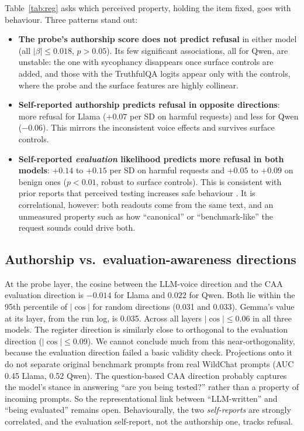\documentclass[10pt]{article}
\begin{document}
Table~\ref{tab:reg} asks which perceived property, holding the item fixed, goes with behaviour. Three patterns stand out:
\begin{itemize}
\item \textbf{The probe's authorship score does not predict refusal} in either model (all $|\beta|\le 0.018$, $p>0.05$). Its few significant associations, all for Qwen, are unstable: the one with sycophancy disappears once surface controls are added, and those with the TruthfulQA logits appear only with the controls, where the probe and the surface features are highly collinear.
\item \textbf{Self-reported authorship predicts refusal in opposite directions}: more refusal for Llama ($+0.07$ per SD on harmful requests) and less for Qwen ($-0.06$). This mirrors the inconsistent voice effects and survives surface controls.
\item \textbf{Self-reported \emph{evaluation} likelihood predicts more refusal in both models}: $+0.14$ to $+0.15$ per SD on harmful requests and $+0.05$ to $+0.09$ on benign ones ($p<0.01$, robust to surface controls). This is consistent with prior reports that perceived testing increases safe behaviour \citep{abdelnabi2025hawthorne,xiong2025pre}. It is correlational, however: both readouts come from the same text, and an unmeasured property such as how ``canonical'' or ``benchmark-like'' the request sounds could drive both.
\end{itemize}

\subsection{Authorship vs.\ evaluation-awareness directions}
At the probe layer, the cosine between the LLM-voice direction and the CAA evaluation direction is $-0.014$ for Llama and $0.022$ for Qwen. Both lie within the 95th percentile of $|\cos|$ for random directions (0.031 and 0.033). Gemma's value at its layer, from the run log, is 0.035. Across all layers $|\cos|\le 0.06$ in all three models. The register direction is similarly close to orthogonal to the evaluation direction ($|\cos|\le 0.09$). We cannot conclude much from this near-orthogonality, because the evaluation direction failed a basic validity check. Projections onto it do not separate original benchmark prompts from real WildChat prompts (AUC 0.45 Llama, 0.52 Qwen). The question-based CAA direction probably captures the model's stance in answering ``are you being tested?'' rather than a property of incoming prompts. So the representational link between ``LLM-written'' and ``being evaluated'' remains open. Behaviourally, the two \emph{self-reports} are strongly correlated, and the evaluation self-report, not the authorship one, tracks refusal.
\end{document}

